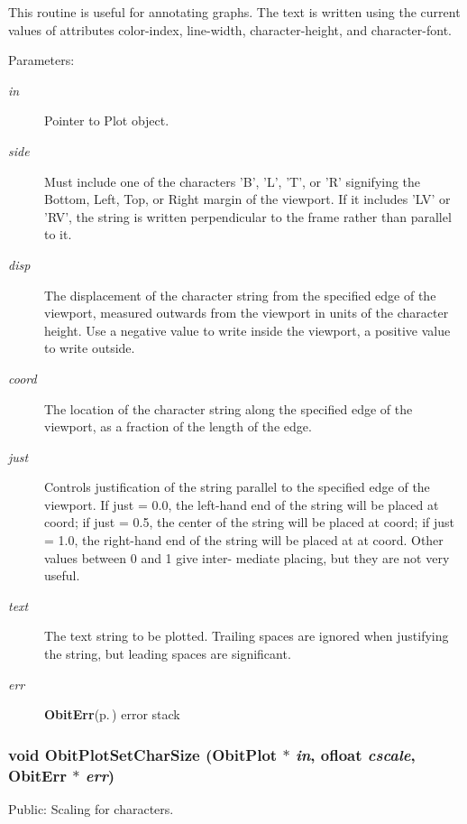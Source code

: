 This routine is useful for annotating graphs. The text is written using the current values of attributes color-index, line-width, character-height, and character-font. \begin{Desc}
\item[Parameters:]
\begin{description}
\item[{\em in}]Pointer to Plot object. \item[{\em side}]Must include one of the characters 'B', 'L', 'T', or 'R' signifying the Bottom, Left, Top, or Right margin of the viewport. If it includes 'LV' or 'RV', the string is written perpendicular to the frame rather than parallel to it. \item[{\em disp}]The displacement of the character string from the specified edge of the viewport, measured outwards from the viewport in units of the character height. Use a negative value to write inside the viewport, a positive value to write outside. \item[{\em coord}]The location of the character string along the specified edge of the viewport, as a fraction of the length of the edge. \item[{\em just}]Controls justification of the string parallel to the specified edge of the viewport. If just = 0.0, the left-hand end of the string will be placed at coord; if just = 0.5, the center of the string will be placed at coord; if just = 1.0, the right-hand end of the string will be placed at at coord. Other values between 0 and 1 give inter- mediate placing, but they are not very useful. \item[{\em text}]The text string to be plotted. Trailing spaces are ignored when justifying the string, but leading spaces are significant. \item[{\em err}]{\bf Obit\-Err}{\rm (p.\,\pageref{structObitErr})} error stack \end{description}
\end{Desc}
\subsubsection{\setlength{\rightskip}{0pt plus 5cm}void Obit\-Plot\-Set\-Char\-Size ({\bf Obit\-Plot} $\ast$ {\em in}, {\bf ofloat} {\em cscale}, {\bf Obit\-Err} $\ast$ {\em err})}\label{ObitPlot_8c_a20}


Public: Scaling for characters. 

